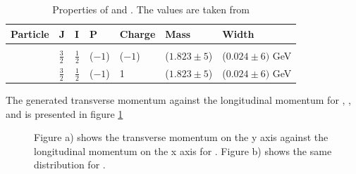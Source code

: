 \begin{table}[htbp]
	\centering
	\caption{Properties of \excitedcascade and \excitedanticascade. The values are taken from \cite{PDG}}
	\label{tab:eventgeneration_Xivalues}
	\begin{tabular}{lllllll}
		\hline
		Particle & J & I & P & Charge & Mass  & Width \\
		\hline
		\hline
		&&&&&&\\
		\excitedcascade & $\frac{3}{2}$ & $\frac{1}{2}$ & ($-1$) & ($-1$) & ($1.823 \pm 5$)\massunit & ($0.024 \pm 6) $ GeV \\
		\excitedanticascade & $\frac{3}{2}$ & $\frac{1}{2}$ & ($-1$) & 1 & ($1.823 \pm 5$)\massunit & ($0.024 \pm 6) $ GeV\\
		\hline
		  
	\end{tabular}
\end{table}

The generated transverse momentum against the longitudinal momentum for \lam, \alam, \anticascade and \excitedcascade is 
presented in figure \ref{fig:MC_lambda0_pt_vs_pz}%


\begin{figure}
	\caption{\propose Figure a) shows the transverse momentum on the y axis against the longitudinal momentum on the x axis for \lam. Figure b) 
			shows the same distribution for \alam.}
	\label{fig:MC_lambda0_pt_vs_pz}
\end{figure}


